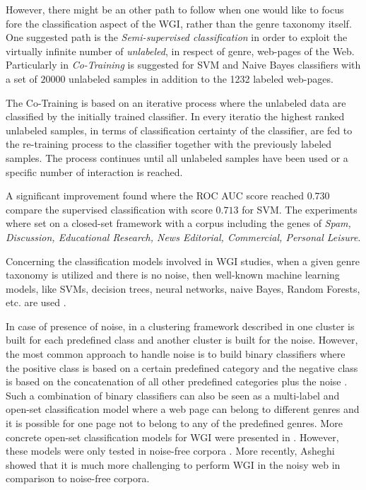 However, there might be an other path to follow when one would like to focus fore the classification aspect of the WGI, rather than the genre taxonomy itself. One suggested path is the \textit{Semi-supervised classification} in order to exploit the virtually infinite number of \textit{unlabeled}, in respect of genre, web-pages of the Web. Particularly in \parencite{chetry2011web}\textit{ Co-Training} is suggested for SVM and Naive Bayes classifiers with a set of $20000$ unlabeled samples in addition to the 1232 labeled web-pages.

The Co-Training is based on an iterative process where the unlabeled data are classified by the initially trained classifier. In every iteratio the highest ranked unlabeled samples, in terms of classification certainty of the classifier, are fed to the re-training process to the classifier together with the previously labeled samples. The process continues until all unlabeled samples have been used or a specific number of interaction is reached. 

A significant improvement found where the ROC AUC score reached $0.730$ compare the supervised classification with score $0.713$ for SVM. The experiments where set on a closed-set framework with a corpus including the genes of \textit{Spam, Discussion, Educational Research, News Editorial, Commercial, Personal Leisure}.

Concerning the classification models involved in WGI studies, when a given genre taxonomy is utilized and there is no noise, then well-known machine learning models, like SVMs, decision trees, neural networks, naive Bayes, Random Forests, etc. are used \parencite{Lim2005,santini2007automatic,kanaris2009learning,jebari2015combination,sharoff2010web}. 

In case of presence of  noise, in a clustering framework described in \parencite{kennedy2005automatic} one cluster is built for each predefined class and another cluster is built for the noise. However, the most  common approach to handle noise is to build binary classifiers where the positive class is based on a certain predefined category and the negative class is based on the concatenation of  all other predefined categories plus the noise \parencite{kennedy2005automatic,dong2006binary,levering2008using}. Such a combination of binary classifiers can also be seen as a multi-label and open-set classification model where a web page can belong to different genres and it is possible for one page not to belong to any of the predefined genres. More concrete open-set  classification models for WGI were presented in \parencite{stubbe2007genre,pritsos2013open}. However, these models were only tested in noise-free corpora \parencite{pritsos2015clef}. More  recently, Asheghi \parencite{Asheghi2015} showed that it is much more challenging to perform WGI in the noisy web in comparison to noise-free corpora.

